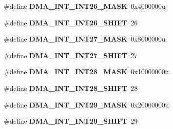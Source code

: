 \begin{DoxyCompactItemize}
\item 
\hypertarget{group___d_m_a___register___masks_gac0becbc7cb4cffcc359cc84198decec2}{}\#define {\bfseries D\+M\+A\+\_\+\+I\+N\+T\+\_\+\+I\+N\+T26\+\_\+\+M\+A\+S\+K}~0x4000000u\label{group___d_m_a___register___masks_gac0becbc7cb4cffcc359cc84198decec2}

\item 
\hypertarget{group___d_m_a___register___masks_gaad36977109eded30e705a7e219c751d1}{}\#define {\bfseries D\+M\+A\+\_\+\+I\+N\+T\+\_\+\+I\+N\+T26\+\_\+\+S\+H\+I\+F\+T}~26\label{group___d_m_a___register___masks_gaad36977109eded30e705a7e219c751d1}

\item 
\hypertarget{group___d_m_a___register___masks_gab0f51503d4b4ea13da0e66560c6bbf89}{}\#define {\bfseries D\+M\+A\+\_\+\+I\+N\+T\+\_\+\+I\+N\+T27\+\_\+\+M\+A\+S\+K}~0x8000000u\label{group___d_m_a___register___masks_gab0f51503d4b4ea13da0e66560c6bbf89}

\item 
\hypertarget{group___d_m_a___register___masks_ga1d5e9663a4287507ef2fddc5714f67af}{}\#define {\bfseries D\+M\+A\+\_\+\+I\+N\+T\+\_\+\+I\+N\+T27\+\_\+\+S\+H\+I\+F\+T}~27\label{group___d_m_a___register___masks_ga1d5e9663a4287507ef2fddc5714f67af}

\item 
\hypertarget{group___d_m_a___register___masks_ga4281a10367114c879a95b37def506681}{}\#define {\bfseries D\+M\+A\+\_\+\+I\+N\+T\+\_\+\+I\+N\+T28\+\_\+\+M\+A\+S\+K}~0x10000000u\label{group___d_m_a___register___masks_ga4281a10367114c879a95b37def506681}

\item 
\hypertarget{group___d_m_a___register___masks_ga65a5b254a448f41e0c8450186776db81}{}\#define {\bfseries D\+M\+A\+\_\+\+I\+N\+T\+\_\+\+I\+N\+T28\+\_\+\+S\+H\+I\+F\+T}~28\label{group___d_m_a___register___masks_ga65a5b254a448f41e0c8450186776db81}

\item 
\hypertarget{group___d_m_a___register___masks_gaf6152b2dd7528afb93175299815099ed}{}\#define {\bfseries D\+M\+A\+\_\+\+I\+N\+T\+\_\+\+I\+N\+T29\+\_\+\+M\+A\+S\+K}~0x20000000u\label{group___d_m_a___register___masks_gaf6152b2dd7528afb93175299815099ed}

\item 
\hypertarget{group___d_m_a___register___masks_gac9a3b53bb8adc03ac4e85bd4edd57699}{}\#define {\bfseries D\+M\+A\+\_\+\+I\+N\+T\+\_\+\+I\+N\+T29\+\_\+\+S\+H\+I\+F\+T}~29\label{group___d_m_a___register___masks_gac9a3b53bb8adc03ac4e85bd4edd57699}


\end{DoxyCompactItemize}
